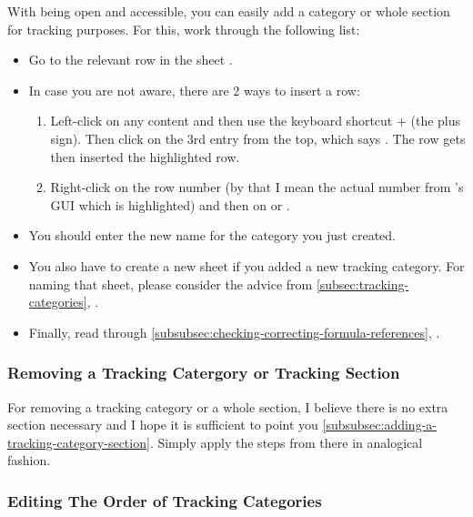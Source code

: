 With \tfn being open and accessible, you can easily add a category or whole section for tracking purposes.
For this, work through the following list:
\begin{itemize}
	\item Go to the relevant row in the sheet .
	\item In case you are not aware, there are 2 ways to insert a row:
	\begin{enumerate}
		\item Left-click on any content and then use the keyboard shortcut +\keystroke{+} (the plus sign).
		Then click on the 3rd entry from the top, which says .
		The row gets then inserted  the highlighted row.
		\item Right-click on the row number (by that I mean the actual number from \loc's GUI which is highlighted) and then on  or .
	\end{enumerate}
	\item You should enter the new name for the category you just created.
	\item You also have to create a new sheet if you added a new tracking category.
	For naming that sheet, please consider the advice from \autoref{subsec:tracking-categories}, .
	\item Finally, read through \autoref{subsubsec:checking-correcting-formula-references}, .
\end{itemize}

\subsubsection{Removing a Tracking Catergory or Tracking Section}
\label{subsubsec:removing-a-tracking-category-section}

For removing a tracking category or a whole section, I believe there is no extra section necessary and I hope it is sufficient to point you \autoref{subsubsec:adding-a-tracking-category-section}.
Simply apply the steps from there in analogical fashion.

\subsubsection{Editing The Order of Tracking Categories}
\label{subsec:editing-order-of-tracking-categories}

